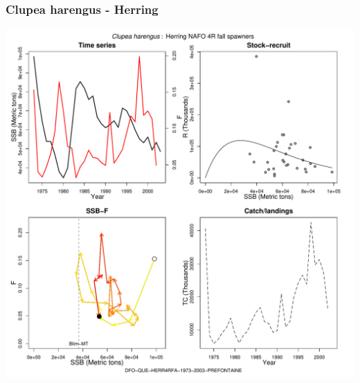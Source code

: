 \subsubsection{Clupea harengus - Herring}
\begin{center}
\includegraphics[width=1.2\textwidth]{../R/figures/DFO-QUE-HERR4RFA-1973-2003-PREFONTAINE.pdf}
\end{center}

